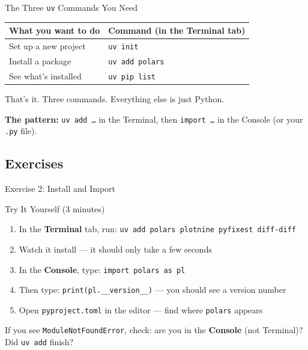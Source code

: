 \documentclass[9pt,aspectratio=169]{beamer}
\begin{document}
\begin{frame}[fragile]{The Three \texttt{uv} Commands You Need}

\begin{tabular}{@{}lp{7.5cm}@{}}
\toprule
\textbf{What you want to do} & \textbf{Command (in the Terminal tab)} \\
\midrule
Set up a new project & \texttt{uv init} \\[0.5em]
Install a package & \texttt{uv add polars} \\[0.5em]
See what's installed & \texttt{uv pip list} \\
\bottomrule
\end{tabular}

\bigskip

That's it. Three commands. Everything else is just Python.

\bigskip

\begin{highlightbox}
\centering
\textbf{The pattern:} \texttt{uv add \ldots} in the Terminal, then \texttt{import \ldots} in the Console (or your \texttt{.py} file).
\end{highlightbox}

\end{frame}


\subsection{Exercises}
\begin{frame}[fragile]{Exercise 2: Install and Import}

\begin{alertblock}{Try It Yourself (3 minutes)}
\begin{enumerate}
    \item In the \textbf{Terminal} tab, run: \texttt{uv add polars plotnine pyfixest diff-diff}
    \item Watch it install --- it should only take a few seconds
    \item In the \textbf{Console}, type: \texttt{import polars as pl}
    \item Then type: \texttt{print(pl.\_\_version\_\_)} --- you should see a version number
    \item Open \texttt{pyproject.toml} in the editor --- find where \texttt{polars} appears
\end{enumerate}
\end{alertblock}

\medskip

\begin{highlightbox}
\centering
If you see \texttt{ModuleNotFoundError}, check: are you in the \textbf{Console} (not Terminal)? Did \texttt{uv add} finish?
\end{highlightbox}

\end{frame}
\end{document}
